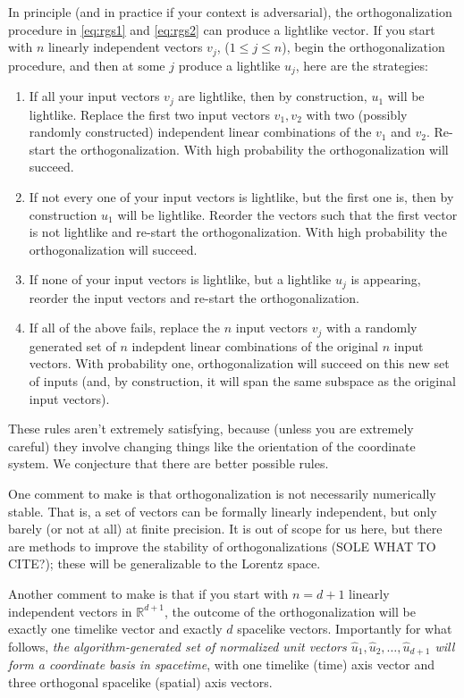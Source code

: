 \documentclass{article}
\begin{document}
In principle (and in practice if your context is adversarial), the orthogonalization procedure in \eqref{eq:rgs1} and \eqref{eq:rgs2} can produce a lightlike vector.
If you start with $n$ linearly independent vectors $v_j$, ($1\leq j\leq n$), begin the orthogonalization procedure, and then at some $j$ produce a lightlike $u_j$, here are the strategies:
\begin{enumerate}
    \item If all your input vectors $v_j$ are lightlike, then by construction, $u_1$ will be lightlike.
    Replace the first two input vectors $v_1, v_2$ with two (possibly randomly constructed) independent linear combinations of the $v_1$ and $v_2$.
    Re-start the orthogonalization.
    With high probability the orthogonalization will succeed.
    \item If not every one of your input vectors is lightlike, but the first one is, then by construction $u_1$ will be lightlike.
    Reorder the vectors such that the first vector is not lightlike and re-start the orthogonalization.
    With high probability the orthogonalization will succeed.
    \item If none of your input vectors is lightlike, but a lightlike $u_j$ is appearing, reorder the input vectors and re-start the orthogonalization.
    \item If all of the above fails, replace the $n$ input vectors $v_j$ with a randomly generated set of $n$ indepdent linear combinations of the original $n$ input vectors.
    With probability one, orthogonalization will succeed on this new set of inputs (and, by construction, it will span the same subspace as the original input vectors).
\end{enumerate}
These rules aren't extremely satisfying, because (unless you are extremely careful) they involve changing things like the orientation of the coordinate system.
We conjecture that there are better possible rules.

One comment to make is that orthogonalization is not necessarily numerically stable.
That is, a set of vectors can be formally linearly independent, but only barely (or not at all) at finite precision.
It is out of scope for us here, but there are methods to improve the stability of orthogonalizations (SOLE WHAT TO CITE?); these will be generalizable to the Lorentz space.

Another comment to make is that if you start with $n=d+1$ linearly independent vectors in $\mathbb{R}^{d+1}$, the outcome of the orthogonalization will be exactly one timelike vector and exactly $d$ spacelike vectors.
Importantly for what follows, \emph{the algorithm-generated set of normalized unit vectors $\hat{u}_1,\hat{u}_2,\ldots,\hat{u}_{d+1}$ will form a coordinate basis in spacetime}, with one timelike (time) axis vector and three orthogonal spacelike (spatial) axis vectors.
\end{document}

